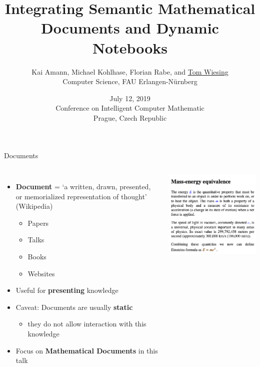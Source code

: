 \documentclass{beamer}
\title[Semantic Documents and Dynamic Notebooks]{Integrating Semantic Mathematical Documents and Dynamic Notebooks}
\author[Tom Wiesing et al.]{Kai Amann, Michael Kohlhase, Florian Rabe, and \underline{Tom Wiesing}\\Computer Science, FAU Erlangen-N{\"u}rnberg}
\date[July 12 2019, CICM Prague]{July 12, 2019\\Conference on Intelligent Computer Mathematic\\Prague, Czech Republic}
\begin{document}
    \frame{\titlepage}
    \begin{frame}{Documents}
        \begin{columns}
            \begin{itemize}
                \item \textbf{Document} = `a written, drawn, presented, or memorialized representation of thought' (Wikipedia)
                \begin{itemize}
                    \item Papers
                    \item Talks
                    \item Books
                    \item Websites
                \end{itemize}
                \item Useful for \textbf{presenting} knowledge
                \item Caveat: Documents are usually \textbf{static}
                \begin{itemize}
                    \item they do not allow interaction with this knowledge
                \end{itemize}
                \item Focus on \textbf{Mathematical Documents} in this talk
            \end{itemize}
            \includegraphics[scale=0.25]{images/doc}
        \end{columns}
    \end{frame}
\end{document}
